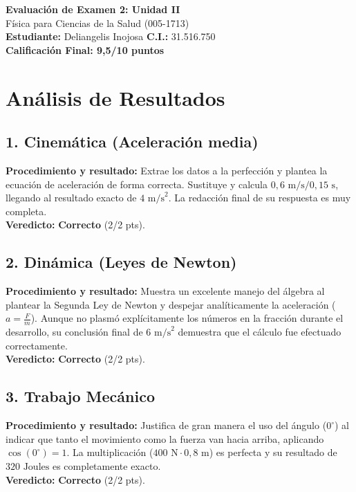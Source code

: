 \documentclass[12pt,letterpaper]{article}
\begin{document}
\begin{center}
    \Large \textbf{Evaluación de Examen 2: Unidad II} \\
    \large Física para Ciencias de la Salud (005-1713) \\
    \vspace{0.5cm}
    \textbf{Estudiante:} Deliangelis Inojosa \quad \textbf{C.I.:} 31.516.750
    \vspace{0.3cm} \\
    \large \textbf{Calificación Final: 9,5/10 puntos}
\end{center}

\vspace{0.5cm}

\section*{Análisis de Resultados}

\subsection*{1. Cinemática (Aceleración media)}
\textbf{Procedimiento y resultado:} Extrae los datos a la perfección y plantea la ecuación de aceleración de forma correcta. Sustituye y calcula $0,6 \text{ m/s} / 0,15 \text{ s}$, llegando al resultado exacto de $4 \text{ m/s}^2$. La redacción final de su respuesta es muy completa. \\
\textbf{Veredicto:} \textbf{Correcto} (2/2 pts).

\subsection*{2. Dinámica (Leyes de Newton)}
\textbf{Procedimiento y resultado:} Muestra un excelente manejo del álgebra al plantear la Segunda Ley de Newton y despejar analíticamente la aceleración ($a = \frac{F}{m}$). Aunque no plasmó explícitamente los números en la fracción durante el desarrollo, su conclusión final de $6 \text{ m/s}^2$ demuestra que el cálculo fue efectuado correctamente. \\
\textbf{Veredicto:} \textbf{Correcto} (2/2 pts).

\subsection*{3. Trabajo Mecánico}
\textbf{Procedimiento y resultado:} Justifica de gran manera el uso del ángulo ($0^\circ$) al indicar que tanto el movimiento como la fuerza van hacia arriba, aplicando $\cos(0^\circ) = 1$. La multiplicación ($400 \text{ N} \cdot 0,8 \text{ m}$) es perfecta y su resultado de $320 \text{ Joules}$ es completamente exacto. \\
\textbf{Veredicto:} \textbf{Correcto} (2/2 pts).
\end{document}

